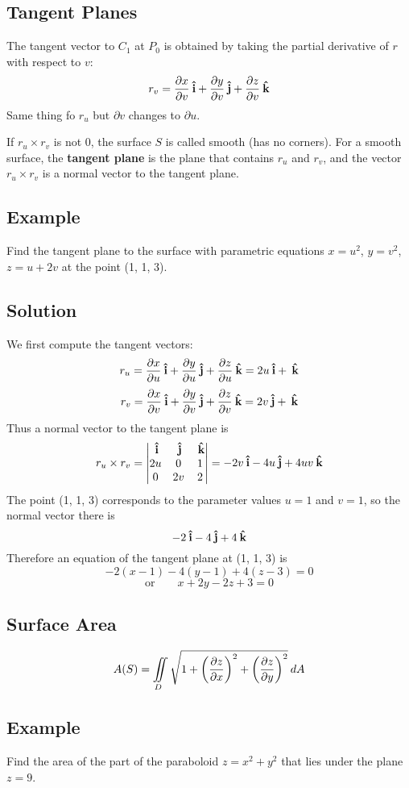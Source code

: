 \subsection*{Tangent Planes}
The tangent vector to $C_1$ at $P_0$ is obtained by taking the partial derivative
of $r$ with respect to $v$:
$$r_v=\pdv{x}{v}(u_0,v_0)\:\boldsymbol{\hat{\textbf{i}}}+\pdv{y}{v}(u_0,v_0)\:\boldsymbol{\hat{\textbf{j}}}+\pdv{z}{v}(u_0,v_0)\:\boldsymbol{\hat{\textbf{k}}}$$
Same thing fo $r_u$ but $\partial v$ changes to $\partial u$.

If $r_u\times r_v$ is not 0, the surface $S$ is called smooth (has no corners).
For a smooth surface, the \textbf{tangent plane} is the plane that contains $r_u$ and
$r_v$, and the vector $r_u\times r_v$ is a normal vector to the tangent plane.

\subsection*{Example}
Find the tangent plane to the surface with parametric equations $x=u^2$, $y=v^2$,
$z=u+2v$ at the point (1, 1, 3).

\subsection*{Solution}
We first compute the tangent vectors:
$$r_u=\pdv{x}{u}\:\boldsymbol{\hat{\textbf{i}}}+\pdv{y}{u}\:\boldsymbol{\hat{\textbf{j}}}+\pdv{z}{u}\:\boldsymbol{\hat{\textbf{k}}}=2u\:\boldsymbol{\hat{\textbf{i}}}+\:\boldsymbol{\hat{\textbf{k}}}$$
$$r_v=\pdv{x}{v}\:\boldsymbol{\hat{\textbf{i}}}+\pdv{y}{v}\:\boldsymbol{\hat{\textbf{j}}}+\pdv{z}{v}\:\boldsymbol{\hat{\textbf{k}}}=2v\:\boldsymbol{\hat{\textbf{j}}}+\:\boldsymbol{\hat{\textbf{k}}}$$
Thus a normal vector to the tangent plane is
$$r_u\times r_v=\begin{vmatrix}
                \:\boldsymbol{\hat{\textbf{i}}} & \:\boldsymbol{\hat{\textbf{j}}} & \:\boldsymbol{\hat{\textbf{k}}} \\
                2u    & 0     & 1     \\
                0     & 2v    & 2
        \end{vmatrix}=-2v\:\boldsymbol{\hat{\textbf{i}}}-4u\:\boldsymbol{\hat{\textbf{j}}}+4uv\:\boldsymbol{\hat{\textbf{k}}}$$
The point (1, 1, 3) corresponds to the parameter values $u=1$ and $v=1$, so the normal vector there is
$$-2\:\boldsymbol{\hat{\textbf{i}}}-4\:\boldsymbol{\hat{\textbf{j}}}+4\:\boldsymbol{\hat{\textbf{k}}}$$
Therefore an equation of the tangent plane at (1, 1, 3) is
$$-2(x-1)-4(y-1)+4(z-3)=0$$
$$\text{or} \qquad x+2y-2z+3=0$$

\subsection*{Surface Area}
$$A(S)=\iint\limits_D \sqrt{1+\left(\pdv{z}{x}\right)^2+\left(\pdv{z}{y}\right)^2}\:dA$$

\subsection*{Example}
Find the area of the part of the paraboloid $z=x^2+y^2$ that lies under the plane $z=9$.

